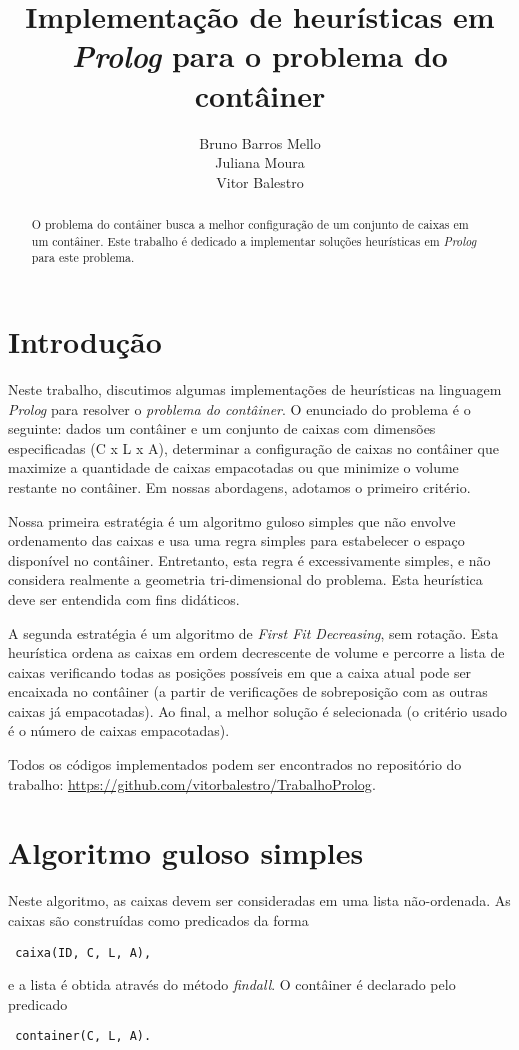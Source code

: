 \documentclass[12pt]{article}
\title{Implementação de heurísticas em \emph{Prolog} para o problema do contâiner}
\author{Bruno Barros Mello\inst{1} \\ Juliana Moura\inst{1} \\  Vitor
  Balestro\inst{1,2} }
\begin{document}
\maketitle

\begin{abstract} O problema do contâiner busca a melhor configuração de um conjunto de caixas em um contâiner. Este trabalho é dedicado a implementar soluções heurísticas em \emph{Prolog} para este problema.

\end{abstract}


\section{Introdução}

Neste trabalho, discutimos algumas implementações de heurísticas na linguagem \emph{Prolog} para resolver o \emph{problema do contâiner}. O enunciado do problema é o seguinte: dados um contâiner e um conjunto de caixas com dimensões especificadas (C x L x A), determinar a configuração de caixas no contâiner que maximize a quantidade de caixas empacotadas ou que minimize o volume restante no contâiner. Em nossas abordagens, adotamos o primeiro critério.

Nossa primeira estratégia é um algoritmo guloso simples que não envolve ordenamento das caixas e usa uma regra simples para estabelecer o espaço disponível no contâiner. Entretanto, esta regra é excessivamente simples, e não considera realmente a geometria tri-dimensional do problema. Esta heurística deve ser entendida com fins didáticos.

A segunda estratégia é um algoritmo de \emph{First Fit Decreasing}, sem rotação. Esta heurística ordena as caixas em ordem decrescente de volume e percorre a lista de caixas verificando todas as posições possíveis em que a caixa atual pode ser encaixada no contâiner (a partir de verificações de sobreposição com as outras caixas já empacotadas). Ao final, a melhor solução é selecionada (o critério usado é o número de caixas empacotadas).

Todos os códigos implementados podem ser encontrados no repositório do trabalho: \url{https://github.com/vitorbalestro/TrabalhoProlog}.

\section{Algoritmo guloso simples}

Neste algoritmo, as caixas devem ser consideradas em uma lista não-ordenada. As caixas são construídas como predicados da forma
\begin{verbatim} caixa(ID, C, L, A),
\end{verbatim}
e a lista é obtida através do método \emph{findall}. O contâiner é declarado pelo predicado
\begin{verbatim} container(C, L, A).
\end{verbatim}
\end{document}
